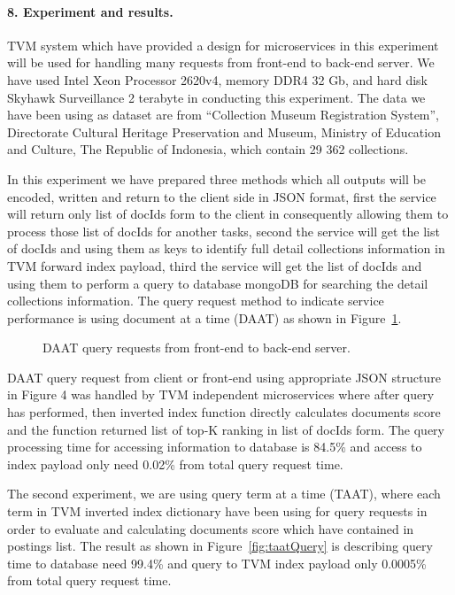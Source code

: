 \paragraph{8. Experiment and results.} TVM system which have provided a design for microservices in this experiment will be used for handling many requests from front-end to back-end server. We have used Intel Xeon Processor 2620v4, memory DDR4 32 Gb, and hard disk Skyhawk Surveillance 2 terabyte in conducting this experiment. The data we have been using as dataset are from “Collection Museum Registration System”, Directorate Cultural Heritage Preservation and Museum, Ministry of Education and Culture, The Republic of Indonesia, which contain 29 362 collections.

In this experiment we have prepared three methods which all outputs will be encoded, written and return to the client side in JSON format, first the service will return only list of docIds form to the client in consequently allowing them to process those list of docIds for another tasks, second the service will get the list of docIds and using them as keys to identify full detail collections information in TVM forward index payload, third the service will get the list of docIds and using them to perform a query to database mongoDB for searching the detail collections information. The query request method to indicate service performance is using document at a time (DAAT) as shown in Figure~\cref{fig:daatQuery}.

\begin{figure}[ht]
	\caption{DAAT query requests from front-end to back-end server.}\label{fig:daatQuery}
\end{figure}


DAAT query request from client or front-end using appropriate JSON structure in Figure 4 was handled by TVM independent microservices where after query has performed, then inverted index function directly calculates documents score and the function returned list of top-K ranking in list of docIds form. The query processing time for accessing information to database is 84.5\% and access to index payload only need 0.02\% from total query request time.

The second experiment, we are using query term at a time (TAAT), where each term in TVM inverted index dictionary have been using for query requests in order to evaluate and calculating documents score which have contained in postings list. The result as shown in Figure~\cref{fig:taatQuery} is describing query time to database need 99.4\% and query to TVM index payload only 0.0005\% from total query request time.


